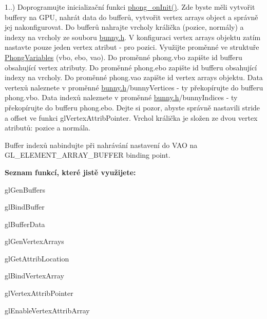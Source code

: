 
\begin{DoxyRefList}
\item[\label{todo__todo000004}%
\hypertarget{todo__todo000004}{}%
Group \hyperlink{group__task1}{task1} ]1..) Doprogramujte inicializační funkci \hyperlink{student_8h_ac2adb2ba4e748239b9db4d037584d3cc}{phong\-\_\-on\-Init()}. Zde byste měli vytvořit buffery na G\-P\-U, nahrát data do bufferů, vytvořit vertex arrays object a správně jej nakonfigurovat. Do bufferů nahrajte vrcholy králička (pozice, normály) a indexy na vrcholy ze souboru \hyperlink{bunny_8h}{bunny.\-h}. V konfiguraci vertex arrays objektu zatím nastavte pouze jeden vertex atribut -\/ pro pozici. Využijte proměnné ve struktuře \hyperlink{structPhongVariables}{Phong\-Variables} (vbo, ebo, vao). Do proměnné phong.\-vbo zapište id bufferu obsahující vertex atributy. Do proměnné phong.\-ebo zapište id bufferu obsahující indexy na vrcholy. Do proměnné phong.\-vao zapište id vertex arrays objektu. Data vertexů naleznete v proměnné \hyperlink{bunny_8h}{bunny.\-h}/bunny\-Vertices -\/ ty překopírujte do bufferu phong.\-vbo. Data indexů naleznete v proměnné \hyperlink{bunny_8h}{bunny.\-h}/bunny\-Indices -\/ ty překopírujte do bufferu phong.\-ebo. Dejte si pozor, abyste správně nastavili stride a offset ve funkci gl\-Vertex\-Attrib\-Pointer. Vrchol králička je složen ze dvou vertex atributů\-: pozice a normála.\par
 Buffer indexů nabindujte při nahrávání nastavení do V\-A\-O na G\-L\-\_\-\-E\-L\-E\-M\-E\-N\-T\-\_\-\-A\-R\-R\-A\-Y\-\_\-\-B\-U\-F\-F\-E\-R binding point.\par
 {\bfseries Seznam funkcí, které jistě využijete\-:}
\begin{DoxyItemize}
\item gl\-Gen\-Buffers
\item gl\-Bind\-Buffer
\item gl\-Buffer\-Data
\item gl\-Gen\-Vertex\-Arrays
\item gl\-Get\-Attrib\-Location
\item gl\-Bind\-Vertex\-Array
\item gl\-Vertex\-Attrib\-Pointer
\item gl\-Enable\-Vertex\-Attrib\-Array 
\end{DoxyItemize}


\end{DoxyRefList}

